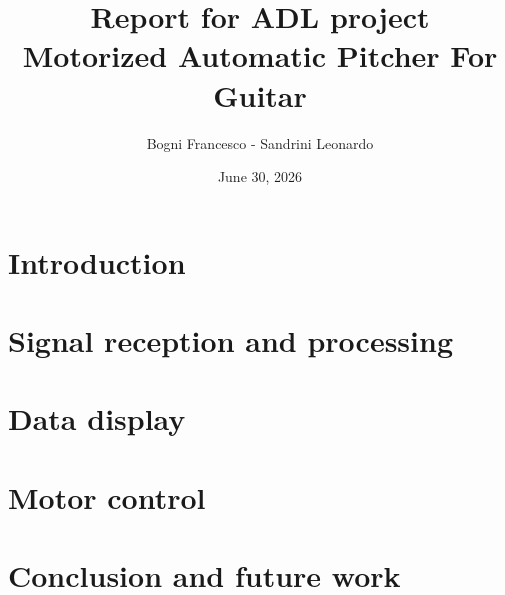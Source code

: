 \documentclass[12pt]{report}
\title{Report for ADL project
\\ \large Motorized Automatic Pitcher For Guitar}
\author{Bogni Francesco - Sandrini Leonardo}
\date{June 30, 2026}
\begin{document}
\maketitle

\tableofcontents


\chapter{Introduction}


\chapter{Signal reception and processing}\label{chapter:sig}


\chapter{Data display}


\chapter{Motor control}


\chapter{Conclusion and future work}




\end{document}
